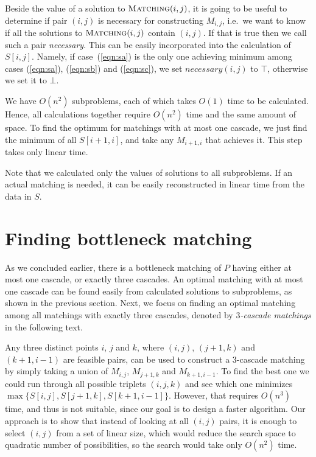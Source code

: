 \documentclass[a4paper, 11pt]{article}
\newcommand{\Matching}{\textsc{Matching}}
\begin{document}
Beside the value of a solution to $\Matching(i,j)$, it is going to be useful to determine if pair $(i,j)$ is necessary for constructing $M_{i,j}$, i.e.\ we want to know if all the solutions to $\Matching(i,j)$ contain $(i,j)$. If that is true then we call such a pair \emph{necessary}. This can be easily incorporated into the calculation of $S[i,j]$. Namely, if case~(\ref{eqn:sa}) is the only one achieving minimum among cases (\ref{eqn:sa}), (\ref{eqn:sb}) and (\ref{eqn:sc}), we set $necessary(i,j)$ to $\top$, otherwise we set it to $\bot$.

We have $O(n^2)$ subproblems, each of which takes $O(1)$ time to be calculated. Hence, all calculations together require $O(n^2)$ time and the same amount of space. To find the optimum for matchings with at most one cascade, we just find the minimum of all $S[i+1,i]$, and take any $M_{i+1,i}$ that achieves it. This step takes only linear time.

Note that we calculated only the values of solutions to all subproblems. If an actual matching is needed, it can be easily reconstructed in linear time from the data in $S$.




\section{Finding bottleneck matching}
\label{sec:FindingBottleneckMatching}

As we concluded earlier, there is a bottleneck matching of $P$ having either at most one cascade, or exactly three cascades. An optimal matching with at most one cascade can be found easily from calculated solutions to subproblems, as shown in the previous section. Next, we focus on finding an optimal matching among all matchings with exactly three cascades, denoted by \emph{$3$-cascade matchings} in the following text.

Any three distinct points $i$, $j$ and $k$, where $(i,j)$, $(j+1, k)$ and $(k+1, i-1)$ are feasible pairs, can be used to construct a $3$-cascade matching by simply taking a union of $M_{i,j}$, $M_{j+1,k}$ and $M_{k+1,i-1}$. To find the best one we could run through all possible triplets $(i,j,k)$ and see which one minimizes $\max\{S[i,j], S[j+1,k], S[k+1,i-1]\}$. However, that requires $O(n^3)$ time, and thus is not suitable, since our goal is to design a faster algorithm. Our approach is to show that instead of looking at all $(i,j)$ pairs, it is enough to select $(i,j)$ from a set of linear size, which would reduce the search space to quadratic number of possibilities, so the search would take only $O(n^2)$ time.
\end{document}
